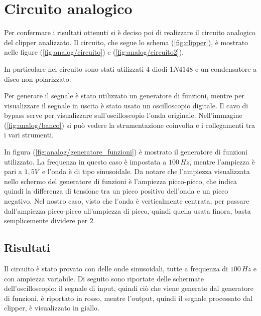 \chapter{Circuito analogico}
	Per confermare i risultati ottenuti si è deciso poi di realizzare il circuito analogico del clipper analizzato. Il circuito, che segue lo schema (\ref{fig:clipper}), è mostrato nelle figure (\ref{fig:analog/circuito}) e (\ref{fig:analog/circuito2}).
	
	
	In particolare nel circuito sono stati utilizzati $4$ diodi $1N4148$ e un condensatore a disco non polarizzato.
	
	Per generare il segnale è stato utilizzato un generatore di funzioni, mentre per visualizzare il segnale in uscita è stato usato un oscilloscopio digitale. Il cavo di bypass serve per visualizzare sull'oscilloscopio l'onda originale. Nell'immagine (\ref{fig:analog/banco}) si può vedere la strumentazione coinvolta e i collegamenti tra i vari strumenti.
	
	In figura (\ref{fig:analog/generatore_funzioni}) è mostrato il generatore di funzioni utilizzato. La frequenza in questo caso è impostata a $100\,Hz$, mentre l'ampiezza è pari a $1,5V\,$ e l'onda è di tipo sinusoidale. Da notare che l'ampiezza visualizzata nello schermo del generatore di funzioni è l'ampiezza picco-picco, che indica quindi la differenza di tensione tra un picco positivo dell'onda e un picco negativo. Nel nostro caso, visto che l'onda è verticalmente centrata, per passare dall'ampiezza picco-picco all'ampiezza di picco, quindi quella usata finora, basta semplicemente dividere per $2$.
	
	
	\section{Risultati}
		Il circuito è stato provato con delle onde sinusoidali, tutte a frequenza di $100\,Hz$ e con ampiezza variabile. Di seguito sono riportate delle schermate dell'oscilloscopio: il segnale di \textcolor{red!90!black}{input}, quindi ciò che viene generato dal generatore di funzioni, è riportato in \textcolor{red!90!black}{rosso}, mentre l'\textcolor{yellow!90!black}{output}, quindi il segnale processato dal clipper, è visualizzato in \textcolor{yellow!90!black}{giallo}.
		
